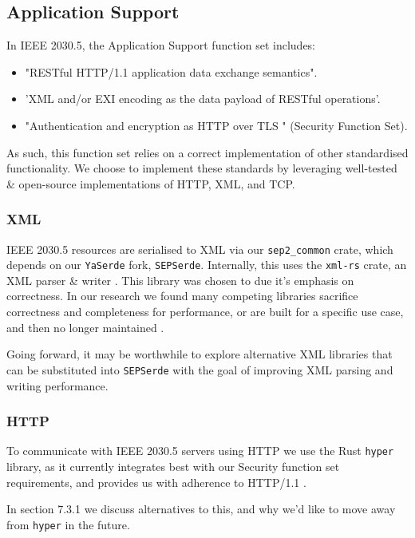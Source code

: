 \subsection{Application Support}
In IEEE 2030.5, the Application Support function set includes:

\begin{itemize}
    \item "RESTful HTTP/1.1 application data exchange semantics".
    \item 'XML and/or EXI encoding as the data payload of RESTful operations'.
    \item "Authentication and encryption as HTTP over TLS " (Security Function Set).
\end{itemize}

\cite{IEEE2030.5}

As such, this function set relies on a correct implementation of other standardised functionality. We choose to implement these standards by leveraging well-tested \& open-source implementations of HTTP, XML, and TCP.

\subsubsection{XML}
IEEE 2030.5 resources are serialised to XML via our \texttt{sep2\_common} crate, which depends on our \texttt{YaSerde} fork, \texttt{SEPSerde}. Internally, this uses the \texttt{xml-rs} crate, an XML parser \& writer \cite{xmlrs}. This library was chosen to due it's emphasis on correctness. In our research we found many competing libraries sacrifice correctness and completeness for performance, or are built for a specific use case, and then no longer maintained \cite{xmlrsperformance}.

Going forward, it may be worthwhile to explore alternative XML libraries that can be substituted into \texttt{SEPSerde} with the goal of improving XML parsing and writing performance. 

\subsubsection{HTTP}
To communicate with IEEE 2030.5 servers using HTTP we use the Rust \texttt{hyper} library, as it currently integrates best with our Security function set requirements, and provides us with adherence to HTTP/1.1 \cite{hyper}. 

In section 7.3.1 we discuss alternatives to this, and why we'd like to move away from \texttt{hyper} in the future.


